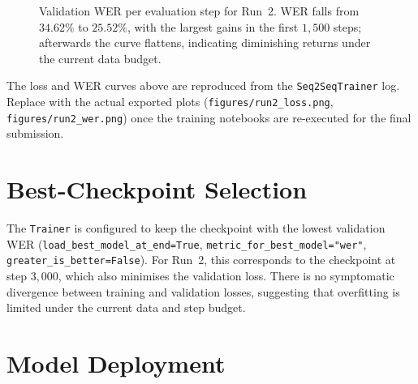 \documentclass[12pt,a4paper]{report}
\begin{document}
\begin{figure}[H]
  \centering
  \caption[Validation WER curve (Run 2)]{Validation WER per evaluation
  step for Run~2. WER falls from $34.62\%$ to $25.52\%$, with the
  largest gains in the first $1{,}500$ steps; afterwards the curve
  flattens, indicating diminishing returns under the current data
  budget.}
  \label{fig:mt_run2_wer}
\end{figure}

\begin{infobox}[title=Note on the curves]
The loss and WER curves above are reproduced from the
\texttt{Seq2SeqTrainer} log. Replace with the actual exported plots
(\texttt{figures/run2\_loss.png}, \texttt{figures/run2\_wer.png}) once
the training notebooks are re-executed for the final submission.
\end{infobox}

\section{Best-Checkpoint Selection}

The \texttt{Trainer} is configured to keep the checkpoint with the
lowest validation WER (\texttt{load\_best\_model\_at\_end=True},
\texttt{metric\_for\_best\_model="wer"}, \texttt{greater\_is\_better=False}).
For Run~2, this corresponds to the checkpoint at step $3{,}000$, which
also minimises the validation loss. There is no symptomatic divergence
between training and validation losses, suggesting that overfitting is
limited under the current data and step budget.

\section{Model Deployment}
\end{document}
